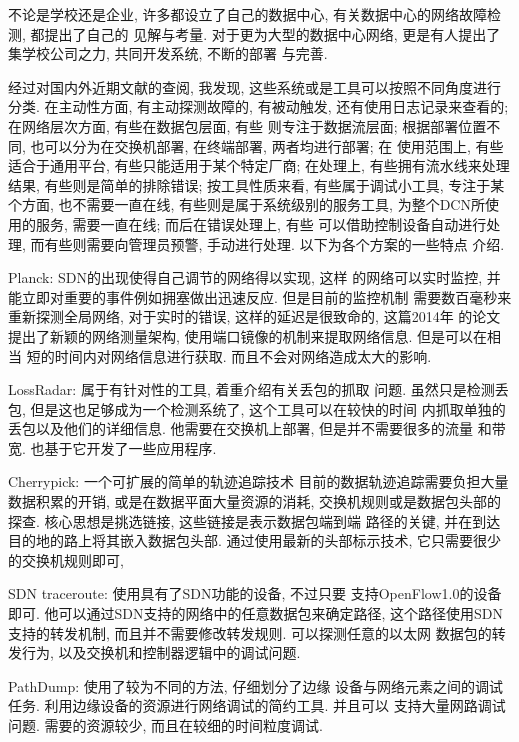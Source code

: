{\begin{mdframed}[everyline=true]
不论是学校还是企业, 许多都设立了自己的数据中心,
有关数据中心的网络故障检测, 都提出了自己的 见解与考量.
对于更为大型的数据中心网络, 更是有人提出了集学校公司之力, 共同开发系统,
不断的部署 与完善.

经过对国内外近期文献的查阅, 我发现,
这些系统或是工具可以按照不同角度进行分类. 在主动性方面,
有主动探测故障的, 有被动触发, 还有使用日志记录来查看的; 在网络层次方面,
有些在数据包层面, 有些 则专注于数据流层面; 根据部署位置不同,
也可以分为在交换机部署, 在终端部署, 两者均进行部署; 在 使用范围上,
有些适合于通用平台, 有些只能适用于某个特定厂商; 在处理上,
有些拥有流水线来处理结果, 有些则是简单的排除错误; 按工具性质来看,
有些属于调试小工具, 专注于某个方面, 也不需要一直在线,
有些则是属于系统级别的服务工具, 为整个DCN所使用的服务, 需要一直在线;
而后在错误处理上, 有些 可以借助控制设备自动进行处理,
而有些则需要向管理员预警, 手动进行处理. 以下为各个方案的一些特点 介绍.

Planck:  SDN的出现使得自己调节的网络得以实现, 这样
的网络可以实时监控, 并能立即对重要的事件例如拥塞做出迅速反应.
但是目前的监控机制 需要数百毫秒来重新探测全局网络, 对于实时的错误,
这样的延迟是很致命的, 这篇2014年 的论文提出了新颖的网络测量架构,
使用端口镜像的机制来提取网络信息. 但是可以在相当
短的时间内对网络信息进行获取. 而且不会对网络造成太大的影响.

LossRadar:  属于有针对性的工具,
着重介绍有关丢包的抓取 问题. 虽然只是检测丢包,
但是这也足够成为一个检测系统了, 这个工具可以在较快的时间
内抓取单独的丢包以及他们的详细信息. 他需要在交换机上部署,
但是并不需要很多的流量 和带宽. 也基于它开发了一些应用程序.

Cherrypick:  一个可扩展的简单的轨迹追踪技术
目前的数据轨迹追踪需要负担大量数据积累的开销,
或是在数据平面大量资源的消耗, 交换机规则或是数据包头部的探查.
核心思想是挑选链接, 这些链接是表示数据包端到端 路径的关键,
并在到达目的地的路上将其嵌入数据包头部. 通过使用最新的头部标示技术,
它只需要很少的交换机规则即可,

SDN traceroute:  使用具有了SDN功能的设备, 不过只要
支持OpenFlow1.0的设备即可.
他可以通过SDN支持的网络中的任意数据包来确定路径,
这个路径使用SDN支持的转发机制, 而且并不需要修改转发规则.
可以探测任意的以太网 数据包的转发行为,
以及交换机和控制器逻辑中的调试问题.

PathDump: 使用了较为不同的方法,
仔细划分了边缘 设备与网络元素之间的调试任务.
利用边缘设备的资源进行网络调试的简约工具. 并且可以 支持大量网路调试问题.
需要的资源较少, 而且在较细的时间粒度调试.


\end{mdframed}}

